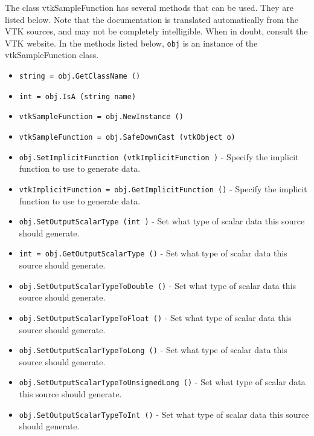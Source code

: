 The class vtkSampleFunction has several methods that can be used.
  They are listed below.
Note that the documentation is translated automatically from the VTK sources,
and may not be completely intelligible.  When in doubt, consult the VTK website.
In the methods listed below, \verb|obj| is an instance of the vtkSampleFunction class.
\begin{itemize}
\item  \verb|string = obj.GetClassName ()|

\item  \verb|int = obj.IsA (string name)|

\item  \verb|vtkSampleFunction = obj.NewInstance ()|

\item  \verb|vtkSampleFunction = obj.SafeDownCast (vtkObject o)|

\item  \verb|obj.SetImplicitFunction (vtkImplicitFunction )| -  Specify the implicit function to use to generate data.

\item  \verb|vtkImplicitFunction = obj.GetImplicitFunction ()| -  Specify the implicit function to use to generate data.

\item  \verb|obj.SetOutputScalarType (int )| -  Set what type of scalar data this source should generate.

\item  \verb|int = obj.GetOutputScalarType ()| -  Set what type of scalar data this source should generate.

\item  \verb|obj.SetOutputScalarTypeToDouble ()| -  Set what type of scalar data this source should generate.

\item  \verb|obj.SetOutputScalarTypeToFloat ()| -  Set what type of scalar data this source should generate.

\item  \verb|obj.SetOutputScalarTypeToLong ()| -  Set what type of scalar data this source should generate.

\item  \verb|obj.SetOutputScalarTypeToUnsignedLong ()| -  Set what type of scalar data this source should generate.

\item  \verb|obj.SetOutputScalarTypeToInt ()| -  Set what type of scalar data this source should generate.


\end{itemize}
